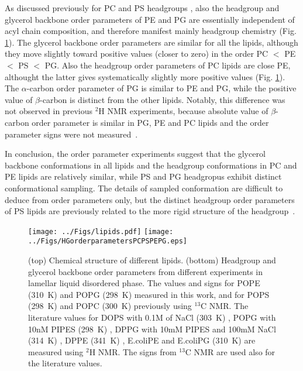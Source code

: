 \documentclass[aps,prl,superscriptaddress,twocolumn]{revtex4}
\begin{document}
As discussed previously for PC and PS headgroups \cite{ollila16,antila19}, also 
the headgroup and glycerol backbone order parameters of PE and PG are essentially independent of 
acyl chain composition, and therefore manifest mainly headgroup chemistry (Fig. \ref{HGorderParameters}).
The glycerol backbone order parameters are similar for all the lipids, although they move slightly toward
positive values (closer to zero) in the order PC $<$ PE $<$ PS $<$ PG. 
Also the headgroup order parameters of PC lipids are close PE, althought the latter gives systematically
slightly more positive values (Fig. \ref{HGorderParameters}).
The $\alpha$-carbon order parameter of PG is similar to PE and PG, while the positive value of $\beta$-carbon
is distinct from the other lipids. Notably, this difference was not observed in previous $^2$H NMR experiments,
because absolute value of $\beta$-carbon order parameter is similar in PG, PE and PC lipids and the order parameter
signs were not measured~\cite{wohlgemuth80,gally81,borle85}.

In conclusion, the order parameter experiments suggest that the glycerol backbone conformations in all lipids
and the headgroup conformations in PC and PE lipids are relatively similar, while 
PS and PG headgropus exhibit distinct conformational sampling.
The details of sampled conformation are difficult to deduce from order parameters only,
but the distinct headgroup order parameters
of PS lipids are previously related to the more rigid structure of the headgroup~\cite{browning80,buldt81,antila19}.

\begin{figure}[]
  \centering
  \texttt{[image: ../Figs/lipids.pdf]}
  \texttt{[image: ../Figs/HGorderparametersPCPSPEPG.eps]}
  \caption{\label{HGorderParameters}
    (top) Chemical structure of different lipids.
    (bottom) Headgroup and glycerol backbone order parameters
    from different experiments in lamellar liquid disordered phase.
    The values and signs for POPE (310~K) and POPG (298~K)
    measured in this work, and for POPS (298~K) \cite{antila19} and POPC (300~K) \cite{ferreira13,ferreira16}
    previously using $^{13}$C NMR. The literature values for
    DOPS with 0.1M of NaCl (303~K) \cite{browning80},
    POPG with 10nM PIPES (298~K) \cite{borle85},
    DPPG with 10mM PIPES and 100mM NaCl (314~K) \cite{wohlgemuth80}, 
    DPPE (341~K) \cite{seelig76},
    E.coliPE and E.coliPG (310~K) \cite{gally81}
    are measured using $^2$H NMR. The signs from $^{13}$C NMR are used also for the literature values.
  }
\end{figure}
\end{document}
